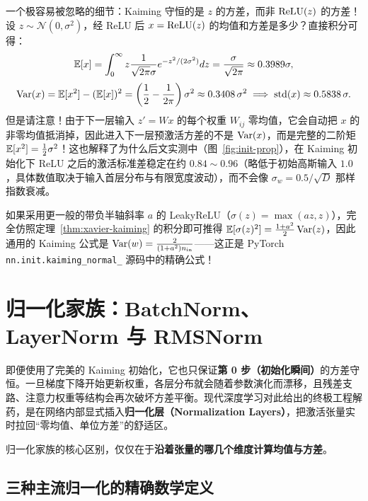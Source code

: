 \begin{insightBox}{一个极容易被忽略的细节：Kaiming 守恒的是 $z$ 的方差，而非 $\operatorname{ReLU}(z)$ 的方差！}
设 $z \sim \mathcal{N}(0, \sigma^2)$，经 ReLU 后 $x = \operatorname{ReLU}(z)$ 的均值和方差是多少？直接积分可得：
\[
  \mathbb{E}[x] = \int_0^\infty z \frac{1}{\sqrt{2\pi}\sigma} e^{-z^2/(2\sigma^2)} dz = \frac{\sigma}{\sqrt{2\pi}} \approx 0.3989\sigma,
\]
\[
  \operatorname{Var}(x) = \mathbb{E}[x^2] - (\mathbb{E}[x])^2 = \left(\frac{1}{2} - \frac{1}{2\pi}\right)\sigma^2 \approx 0.3408\,\sigma^2 \implies \operatorname{std}(x) \approx 0.5838\,\sigma.
\]
但是请注意！由于下一层输入 $z' = Wx$ 的每个权重 $W_{ij}$ 零均值，它会自动把 $x$ 的非零均值抵消掉，因此进入下一层预激活方差的不是 $\operatorname{Var}(x)$，而是完整的二阶矩 $\mathbb{E}[x^2] = \frac{1}{2}\sigma^2$！这也解释了为什么后文实测中（图~\ref{fig:init-prop}），在 Kaiming 初始化下 ReLU 之后的激活标准差稳定在约 $0.84 \sim 0.96$（略低于初始高斯输入 $1.0$，具体数值取决于输入首层分布与有限宽度波动），而不会像 $\sigma_w = 0.5/\sqrt{D}$ 那样指数衰减。
\end{insightBox}

如果采用更一般的带负半轴斜率 $a$ 的 LeakyReLU（$\sigma(z) = \max(az, z)$），完全仿照定理~\ref{thm:xavier-kaiming} 的积分即可推得 $\mathbb{E}[\sigma(z)^2] = \frac{1 + a^2}{2}\operatorname{Var}(z)$，因此通用的 Kaiming 公式是 $\operatorname{Var}(w) = \frac{2}{(1+a^2)n_{\text{in}}}$——这正是 PyTorch \texttt{nn.init.kaiming\_normal\_} 源码中的精确公式！

\section{归一化家族：BatchNorm、LayerNorm 与 RMSNorm}
\label{sec:normalization}

即便使用了完美的 Kaiming 初始化，它也只保证\textbf{第 0 步（初始化瞬间）}的方差守恒。一旦梯度下降开始更新权重，各层分布就会随着参数演化而漂移，且残差支路、注意力权重等结构会再次破坏方差平衡。现代深度学习对此给出的终极工程解药，是在网络内部显式插入\textbf{归一化层（Normalization Layers）}，把激活张量实时拉回“零均值、单位方差”的舒适区。

归一化家族的核心区别，仅仅在于\textbf{沿着张量的哪几个维度计算均值与方差}。

\subsection{三种主流归一化的精确数学定义}

